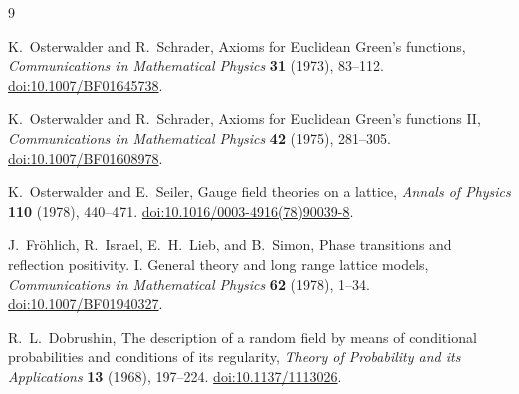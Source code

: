 \documentclass[11pt]{article}
\begin{document}
\begin{thebibliography}{9}

K.~Osterwalder and R.~Schrader,
\newblock Axioms for Euclidean Green's functions,
\newblock \emph{Communications in Mathematical Physics} \textbf{31} (1973), 83--112.
\newblock \href{https://doi.org/10.1007/BF01645738}{doi:10.1007/BF01645738}.

K.~Osterwalder and R.~Schrader,
\newblock Axioms for Euclidean Green's functions II,
\newblock \emph{Communications in Mathematical Physics} \textbf{42} (1975), 281--305.
\newblock \href{https://doi.org/10.1007/BF01608978}{doi:10.1007/BF01608978}.

K.~Osterwalder and E.~Seiler,
\newblock Gauge field theories on a lattice,
\newblock \emph{Annals of Physics} \textbf{110} (1978), 440--471.
\newblock \href{https://doi.org/10.1016/0003-4916(78)90039-8}{doi:10.1016/0003-4916(78)90039-8}.

J.~Fr\"ohlich, R.~Israel, E.~H.~Lieb, and B.~Simon,
\newblock Phase transitions and reflection positivity. I. General theory and long range lattice models,
\newblock \emph{Communications in Mathematical Physics} \textbf{62} (1978), 1--34.
\newblock \href{https://doi.org/10.1007/BF01940327}{doi:10.1007/BF01940327}.

R.~L.~Dobrushin,
\newblock The description of a random field by means of conditional probabilities and conditions of its regularity,
\newblock \emph{Theory of Probability and its Applications} \textbf{13} (1968), 197--224.
\newblock \href{https://doi.org/10.1137/1113026}{doi:10.1137/1113026}.

\end{thebibliography}
\end{document}
